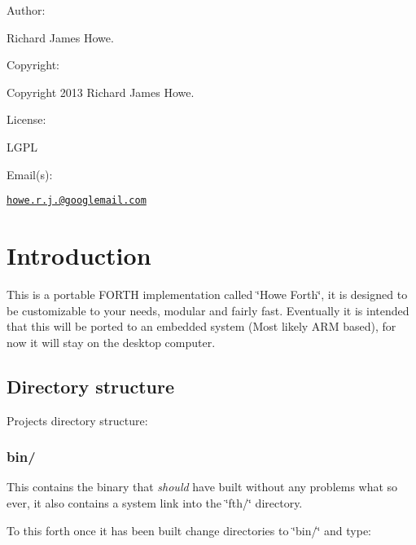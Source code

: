 

Author\-:


\begin{DoxyItemize}
\item Richard James Howe.
\end{DoxyItemize}

Copyright\-:


\begin{DoxyItemize}
\item Copyright 2013 Richard James Howe.
\end{DoxyItemize}

License\-:


\begin{DoxyItemize}
\item L\-G\-P\-L
\end{DoxyItemize}

Email(s)\-:


\begin{DoxyItemize}
\item \href{mailto:howe.r.j.89@googlemail.com}{\tt howe.\-r.\-j.@googlemail.\-com}
\end{DoxyItemize}

\section*{Introduction}

This is a portable F\-O\-R\-T\-H implementation called \char`\"{}\-Howe Forth\char`\"{}, it is designed to be customizable to your needs, modular and fairly fast. Eventually it is intended that this will be ported to an embedded system (Most likely A\-R\-M based), for now it will stay on the desktop computer.

\subsection*{Directory structure}

Projects directory structure\-:

\subsubsection*{bin/}

This contains the binary that {\itshape should} have built without any problems what so ever, it also contains a system link into the \char`\"{}fth/\char`\"{} directory.

To this forth once it has been built change directories to \char`\"{}bin/\char`\"{} and type\-:

